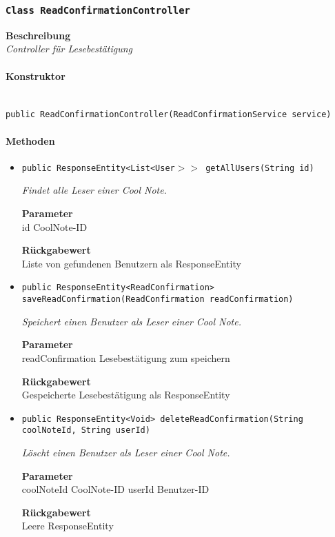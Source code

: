     \subsubsection{\texttt{Class ReadConfirmationController}}
    \textbf{Beschreibung} \\
    \textit{Controller für Lesebestätigung}
    \paragraph*{Konstruktor}\mbox{} \\
    \texttt{public ReadConfirmationController(ReadConfirmationService service)} \\
    \paragraph*{Methoden}
    \begin{itemize}
    	\item{\texttt{public ResponseEntity<List<User$>>$ getAllUsers(String id)}}
    	
    	\textit{Findet alle Leser einer Cool Note.}
    	
    	\textbf{Parameter} \\
    	id CoolNote-ID
    	
    	\textbf{Rückgabewert} \\
    	Liste von gefundenen Benutzern als ResponseEntity        \item{\texttt{public ResponseEntity<ReadConfirmation> saveReadConfirmation(ReadConfirmation readConfirmation)}}
    	
    	\textit{Speichert einen Benutzer als Leser einer Cool Note.}
    	
    	\textbf{Parameter} \\
    	readConfirmation Lesebestätigung zum speichern
    	
    	\textbf{Rückgabewert} \\
    	Gespeicherte Lesebestätigung als ResponseEntity        \item{\texttt{public ResponseEntity<Void> deleteReadConfirmation(String coolNoteId, String userId)}}
    	
    	\textit{Löscht einen Benutzer als Leser einer Cool Note.}
    	
    	\textbf{Parameter} \\
    	coolNoteId CoolNote-ID
    	userId Benutzer-ID
    	
    	\textbf{Rückgabewert} \\
    	Leere ResponseEntity
    \end{itemize}
